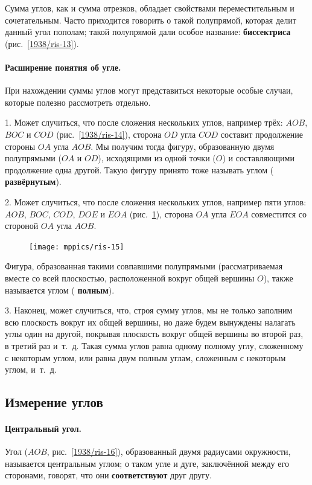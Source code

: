 \documentclass[oneside]{book}
\makeatletter
\newcommand{\rindex}[2][\imki@jobname]{%
  \index[#1]{\detokenize{#2}}%
}
\makeatother
\begin{document}
Сумма углов, как и сумма отрезков, обладает свойствами переместительным и сочетательным.
Часто приходится говорить о такой полупрямой, которая делит данный угол пополам;
такой полупрямой дали особое название:
\rindex{биссектриса}\textbf{биссектриса} (рис.~\ref{1938/ris-13}).


\paragraph{Расширение понятия об угле.}\label{1938/16}
При нахождении суммы углов могут представиться некоторые особые случаи, которые полезно рассмотреть отдельно.

1.
Может случиться, что после сложения нескольких углов, например трёх:
$AOB$, $BOC$ и $COD$ (рис.~\ref{1938/ris-14}), сторона $OD$ угла $COD$ составит продолжение стороны $OA$ угла $AOB$.
Мы получим тогда фигуру, образованную двумя полупрямыми ($OA$ и $OD$), исходящими из одной точки ($O$) и составляющими продолжение одна другой.
Такую фигуру принято тоже называть углом (\rindex{развёрнутый угол}\textbf{развёрнутым}).

2.
Может случиться, что после сложения нескольких углов, например пяти углов:
$AOB$, $BOC$, $COD$, $DOE$ и $EOA$ (рис.~\ref{1938/ris-15}), сторона $OA$ угла $EOA$ совместится со стороной $OA$ угла $AOB$.

\begin{figure}
\centering
\texttt{[image: mppics/ris-15]}
\caption{}\label{1938/ris-15}
\end{figure}

Фигура, образованная такими совпавшими полупрямыми (рассматриваемая вместе со всей плоскостью, расположенной вокруг общей вершины $O$), также называется углом (\rindex{полный угол}\textbf{полным}).


3.
Наконец, может случиться, что, строя сумму углов, мы не только заполним всю плоскость вокруг их общей вершины, но даже будем вынуждены налагать углы один на другой, покрывая плоскость вокруг общей вершины во второй раз, в третий раз и~т.~д.
Такая сумма углов равна одному полному углу, сложенному с некоторым углом, или равна двум полным углам, сложенным с некоторым углом, и~т.~д.

\subsection*{Измерение углов}


\paragraph{Центральный угол.}\label{1938/17}
Угол ($AOB$, рис.~\ref{1938/ris-16}), образованный двумя радиусами окружности, называется центральным углом;
о таком угле и дуге, заключённой между его сторонами, говорят, что они \textbf{соответствуют} друг другу.
\end{document}
